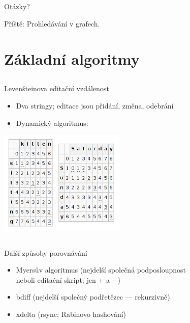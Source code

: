\documentclass{beamer}
\begin{document}
\subsection{}
\begin{frame}{Otázky?}
\begin{center}
Příště: Prohledávání v grafech.
\end{center}
\end{frame}

\section{Základní algoritmy}

\subsection{}
\begin{frame}{Levenšteinova editační vzdálenost}
\begin{itemize}
\item Dva stringy; editace jsou přidání, změna, odebrání
\item Dynamický algoritmus:
\end{itemize}

\begin{center}
\includegraphics[width=6cm]{levehnstein.png}
\end{center}
\end{frame}

\subsection{}
\begin{frame}{Další způsoby porovnávání}
\begin{itemize}
\item Myersův algoritmus (nejdelší společná podposloupnost \\ neboli editační skript; jen $+$ a $-$)
\item bdiff (nejdelší společný podřetězec --- rekurzivně)
\item xdelta (rsync; Rabinovo hashování)
\end{itemize}
\end{frame}
\end{document}

